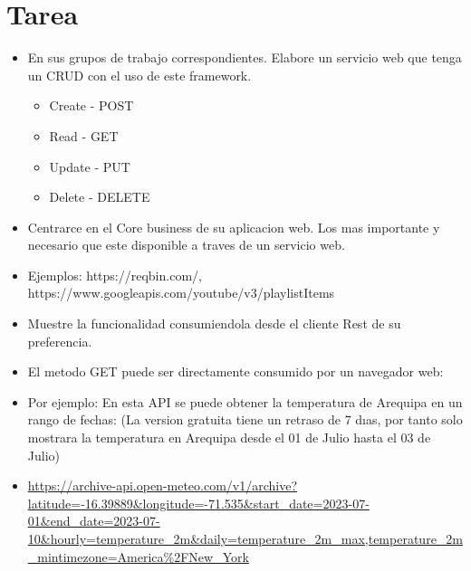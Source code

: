 \documentclass{article}
\begin{document}
	\section{Tarea}
	\begin{itemize}
    \item En sus grupos de trabajo correspondientes. Elabore un servicio web que tenga un CRUD con el uso de este framework.
    \begin{itemize}
        \item Create - POST
        \item Read - GET
        \item Update - PUT
        \item Delete - DELETE
    \end{itemize}
    \item Centrarce en el Core business de su aplicacion web. Los mas importante y necesario que este disponible a traves de un servicio web.
    \item Ejemplos: https://reqbin.com/, https://www.googleapis.com/youtube/v3/playlistItems
    \item Muestre la funcionalidad consumiendola desde el cliente Rest de su preferencia.
    \item El metodo GET puede ser directamente consumido por un navegador web:
    \item Por ejemplo: En esta API se puede obtener la temperatura de Arequipa en un rango de fechas: (La version gratuita tiene un retraso de 7 dıas, por tanto solo mostrara la temperatura en Arequipa desde el 01 de Julio hasta el 03 de Julio)
    \item \url{https://archive-api.open-meteo.com/v1/archive?latitude=-16.39889&longitude=-71.535&start_date=2023-07-01&end_date=2023-07-10&hourly=temperature_2m&daily=temperature_2m_max,temperature_2m_mintimezone=America%2FNew_York}
        \end{itemize}
\end{document}
